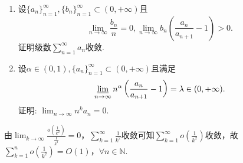 \documentclass[../../main.tex]{subfiles}
\begin{document}
\begin{example}
\begin{enumerate}
\item 设$\{a_n\}_{n=1}^\infty,\{b_n\}_{n=1}^\infty\subset(0,+\infty)$且
$$
\lim_{n\to\infty}\frac{b_n}{n}=0,\lim_{n\to\infty}b_n\left(\frac{a_n}{a_{n+1}}-1\right)>0.
$$
证明级数$\sum_{n=1}^\infty a_n$收敛.

\item 设$\alpha\in(0,1),\{a_n\}_{n=1}^\infty\subset(0,+\infty)$且满足
$$
\varliminf_{n\to\infty}n^\alpha\left(\frac{a_n}{a_{n+1}}-1\right)=\lambda\in(0,+\infty).
$$
证明: $\lim_{n\to\infty}n^k a_n=0$.
\end{enumerate}
\end{example}
\begin{remark}
由$\lim_{k\rightarrow \infty}\frac{o\left( \frac{1}{k^2} \right)}{\frac{1}{k^2}}=0$，$\sum_{k=1}^{\infty}{\frac{1}{k^2}}$收敛可知$\sum_{k=1}^{\infty}{o\left( \frac{1}{k^2} \right)}$收敛，故$\sum_{k=1}^n{o\left( \frac{1}{k^2} \right)}=O\left( 1 \right)$，$\forall n\in \mathbb{N}$.
\end{remark}
\end{document}
